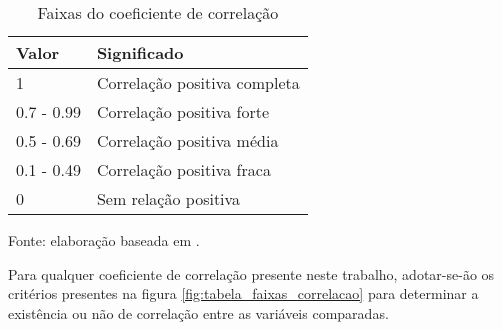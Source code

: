 \begin{table}[]
\caption{Faixas do coeficiente de correlação}
\begin{tabular}{@{}ll@{}}
\toprule
Valor      & Significado                  \\ \midrule
1          & Correlação positiva completa \\ \midrule
0.7 - 0.99 & Correlação positiva forte    \\ \midrule
0.5 - 0.69 & Correlação positiva média    \\ \midrule
0.1 - 0.49 & Correlação positiva fraca    \\ \midrule
0          & Sem relação positiva  \\ \midrule        
\end{tabular}
\footnotesize{Fonte: elaboração baseada em \cite{ali2022spearman}.}
\end{table}

Para qualquer coeficiente de correlação presente neste trabalho, adotar-se-ão os critérios presentes na figura \ref{fig:tabela_faixas_correlacao} para determinar a existência ou não de correlação entre as variáveis comparadas.